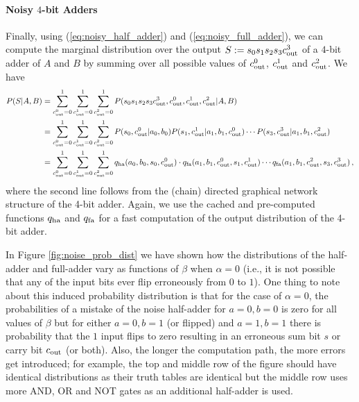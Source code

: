 \paragraph{Noisy $4$-bit Adders} Finally, using (\ref{eq:noisy_half_adder}) and (\ref{eq:noisy_full_adder}), we can compute the marginal distribution over the output $S:=s_0s_1s_2s_3c_{\mathrm{out}}^3$ of a $4$-bit adder of $A$ and $B$ by summing over all possible values of $c_{\mathrm{out}}^0$, $c_{\mathrm{out}}^1$ and $c_{\mathrm{out}}^2$. We have
\begin{align}
    P(S|A,B) & = \sum_{c_{\mathrm{out}}^0=0}^1 \sum_{c_{\mathrm{out}}^1=0}^1 \sum_{c_{\mathrm{out}}^2=0}^1 P(s_0s_1s_2s_3c_{\mathrm{out}}^3,c_{\mathrm{out}}^0,c_{\mathrm{out}}^1,c_{\mathrm{out}}^2|A,B) \nonumber \\
             & = \sum_{c_{\mathrm{out}}^0=0}^1 \sum_{c_{\mathrm{out}}^1=0}^1 \sum_{c_{\mathrm{out}}^2=0}^1 P(s_0,c_{\mathrm{out}}^0|a_0,b_0)P(s_1,c_{\mathrm{out}}^1|a_1,b_1,c_{\mathrm{out}}^0)\cdots P(s_3,c_{\mathrm{out}}^3|a_1,b_1,c_{\mathrm{out}}^2) \nonumber \\
             & = \sum_{c_{\mathrm{out}}^0=0}^1 \sum_{c_{\mathrm{out}}^1=0}^1 \sum_{c_{\mathrm{out}}^2=0}^1 q_{\mathrm{ha}}(a_0,b_0,s_0,c_{\mathrm{out}}^0)\cdot q_{\mathrm{fa}}(a_1,b_1,c_{\mathrm{out}}^0,s_1,c_{\mathrm{out}}^1)\cdots q_{\mathrm{fa}}(a_1,b_1,c_{\mathrm{out}}^2,s_3,c_{\mathrm{out}}^3) \nonumber \,,
\end{align}
where the second line follows from the (chain) directed graphical network structure of the 4-bit adder. Again, we use the cached and pre-computed functions $q_{\mathrm{ha}}$ and $q_{\mathrm{fa}}$ for a fast computation of the output distribution of the 4-bit adder.

In Figure \ref{fig:noise_prob_dist} we have shown how the distributions of the half-adder and full-adder vary as functions of $\beta$ when $\alpha=0$ (i.e., it is not possible that any of the input bits ever flip erroneously from $0$ to $1$). One thing to note about this induced probability distribution is that for the case of $\alpha=0$, the probabilities of a mistake of the noise half-adder for $a=0, b=0$ is zero for all values of $\beta$ but for either $a=0, b=1$ (or flipped) and $a=1, b=1$ there is probability that the $1$ input flips to zero resulting in an erroneous sum bit $s$ or carry bit $c_{\mathrm{out}}$ (or both). Also, the longer the computation path, the more errors get introduced; for example, the top and middle row of the figure should have identical distributions as their truth tables are identical but the middle row uses more AND, OR and NOT gates as an additional half-adder is used.


